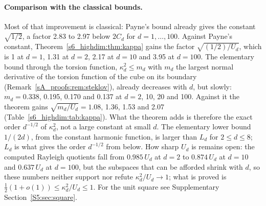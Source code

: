 \paragraph{Comparison with the classical bounds.} Most of that improvement is classical: Payne's
bound already gives the constant $\sqrt{1/2}$, a factor 2.83 to 2.97 below $2C_d$ for
$d=1,\dots,100$. Against Payne's constant, Theorem~\ref{s6_highdim:thm:kappa} gains the factor
$\sqrt{(1/2)/U_d}$, which is 1 at $d=1$, 1.31 at $d=2$, 2.17 at $d=10$ and 3.95 at $d=100$.
The elementary bound through the torsion function, $\kappa_d^2\le m_d$ with $m_d$ the largest
normal derivative of the torsion function of the cube on its boundary
(Remark~\ref{sA_proofs:rem:steklov}), already decreases with $d$, but slowly: $m_d=0.338$, 0.195, 0.170 and 0.137 at
$d=2$, 10, 20 and 100. Against it the theorem gains $\sqrt{m_d/U_d}=1.08$, 1.36, 1.53 and 2.07
(Table~\ref{s6_highdim:tab:kappa}). What the theorem adds is therefore the exact order
$d^{-1/2}$ of $\kappa_d^2$, not a large constant at small $d$.
The elementary lower bound $1/(2d)$, from the constant harmonic function, is larger than $L_d$ for
$2\le d\le8$; $L_d$ is what gives the order $d^{-1/2}$ from below. How sharp $U_d$ is remains
open: the computed Rayleigh quotients fall from $0.985\,U_d$ at $d=2$ to $0.874\,U_d$ at $d=10$
and $0.637\,U_d$ at $d=100$, but the subspaces that can be afforded shrink with $d$, so these
numbers neither support nor refute $\kappa_d^2/U_d\to1$; what is proved is
$\frac12(1+o(1))\le\kappa_d^2/U_d\le1$. For the unit square see Supplementary
Section~\ref{S5:sec:square}.


